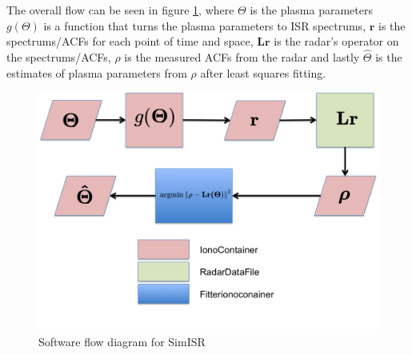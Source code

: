 The overall flow can be seen in figure \ref{fig:swflow}, where  $\Theta$ is the plasma parameters $ g(\Theta)$ is a function that turns the plasma parameters to ISR spectrums, $ \mathbf{r}$ is the spectrums/ACFs for each point of time and space, $ \mathbf{Lr}$ is the radar's operator on the spectrums/ACFs, $ \rho$ is the measured ACFs from the radar and lastly $ \hat{\Theta}$ is the estimates of plasma parameters from $ \rho$ after least squares fitting.

\begin{figure}[!h]
\centering
\includegraphics[width=6.0in]{softwareflowandmath}
\caption{Software flow diagram for SimISR}
\label{fig:swflow}
\end{figure}



